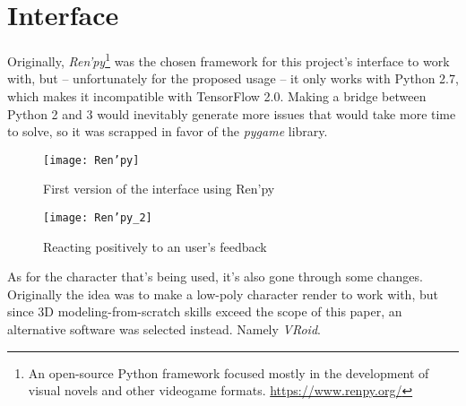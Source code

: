 \section{Interface}
Originally, \textit{Ren'py}\footnote{An open-source Python framework focused mostly in the development of visual novels and other videogame formats. \url{https://www.renpy.org/}} was the chosen framework for this project's interface to work with, but -- unfortunately for the proposed usage -- it only works with Python 2.7, which makes it incompatible with TensorFlow 2.0. Making a bridge between Python 2 and 3 would inevitably generate more issues that would take more time to solve, so it was scrapped in favor of the \textit{pygame} library.
\begin{figure}[!h]
	\centering
	\texttt{[image: Ren'py]}
	\caption{First version of the interface using Ren'py}
	\label{fig:renpy_test_1}
\end{figure}
\begin{figure}[!h]
	\centering
	\texttt{[image: Ren'py\_2]}
	\caption{Reacting positively to an user's feedback}
	\label{fig:renpy_test_2}
\end{figure}
As for the character that's being used, it's also gone through some changes. Originally the idea was to make a low-poly character render to work with, but since 3D modeling-from-scratch skills exceed the scope of this paper, an alternative software was selected instead. Namely \textit{VRoid}.


